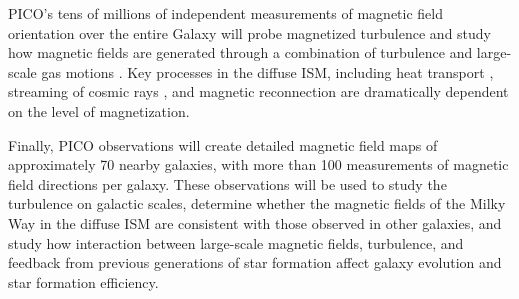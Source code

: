 \documentclass[PICOReport.tex]{subfiles}
\begin{document}
PICO's tens of millions of independent measurements of magnetic field orientation over the entire Galaxy will probe magnetized turbulence and study how magnetic fields are generated through a combination of turbulence and large-scale gas motions \citep{Xu_2018}.   Key processes in the diffuse ISM, including heat transport \citep{Lazarian:2006}, streaming of cosmic rays \citep{Lazarian:2016}, and magnetic reconnection \citep{Lazarian_Vishniac:1999} are dramatically dependent on the level of magnetization. 

Finally, PICO observations will create detailed magnetic field maps of approximately 70 nearby galaxies, with more than 100 measurements of magnetic field directions per galaxy.  These observations will be used to study the turbulence on galactic scales, determine whether the magnetic fields of the Milky Way in the diffuse \ac{ISM} are consistent with those observed in other galaxies, and study how interaction between large-scale magnetic fields, turbulence, and feedback from previous generations of star formation affect galaxy evolution and star formation efficiency.

%
%
\end{document}
